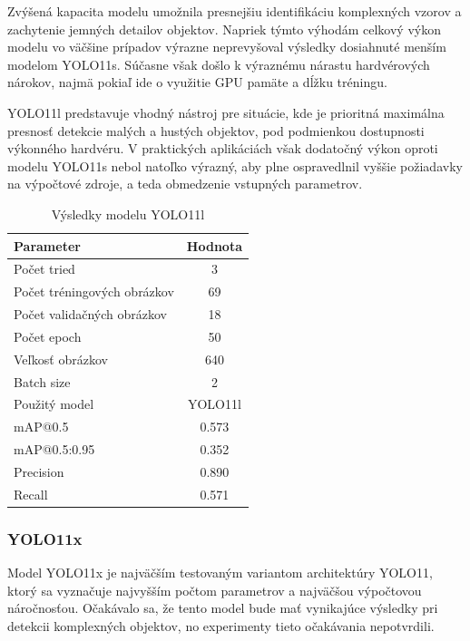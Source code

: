             Zvýšená kapacita modelu umožnila presnejšiu identifikáciu komplexných vzorov a zachytenie jemných detailov objektov. Napriek týmto výhodám celkový výkon modelu vo väčšine prípadov výrazne neprevyšoval výsledky dosiahnuté menším modelom YOLO11s. Súčasne však došlo k výraznému nárastu hardvérových nárokov, najmä pokiaľ ide o využitie GPU pamäte a dĺžku tréningu.

            YOLO11l predstavuje vhodný nástroj pre situácie, kde je prioritná maximálna presnosť detekcie malých a hustých objektov, pod podmienkou dostupnosti výkonného hardvéru. V praktických aplikáciách však dodatočný výkon oproti modelu YOLO11s nebol natoľko výrazný, aby plne ospravedlnil vyššie požiadavky na výpočtové zdroje, a teda obmedzenie vstupných parametrov.
            \begin{table}[H]
                \centering
                
                \begin{tabular}{|l|c|}
                \hline
                \textbf{Parameter} & \textbf{Hodnota} \\ \hline
                Počet tried & 3 \\ \hline
                Počet tréningových obrázkov & 69 \\ \hline
                Počet validačných obrázkov & 18 \\ \hline
                Počet epoch & 50 \\ \hline
                Veľkosť obrázkov & 640 \\ \hline
                Batch size & 2 \\ \hline
                Použitý model & YOLO11l \\ \hline
                mAP@0.5 & 0.573 \\ \hline
                mAP@0.5:0.95 & 0.352 \\ \hline
                Precision & 0.890 \\ \hline
                Recall & 0.571 \\ \hline
                \end{tabular}
                \caption{Výsledky modelu YOLO11l}
                \label{tab:yolo11l}
            \end{table}

            \subsubsection{YOLO11x}
            Model YOLO11x je najväčším testovaným variantom architektúry YOLO11, ktorý sa vyznačuje najvyšším počtom parametrov a najväčšou výpočtovou náročnosťou. Očakávalo sa, že tento model bude mať vynikajúce výsledky pri detekcii komplexných objektov, no experimenty tieto očakávania nepotvrdili. 

